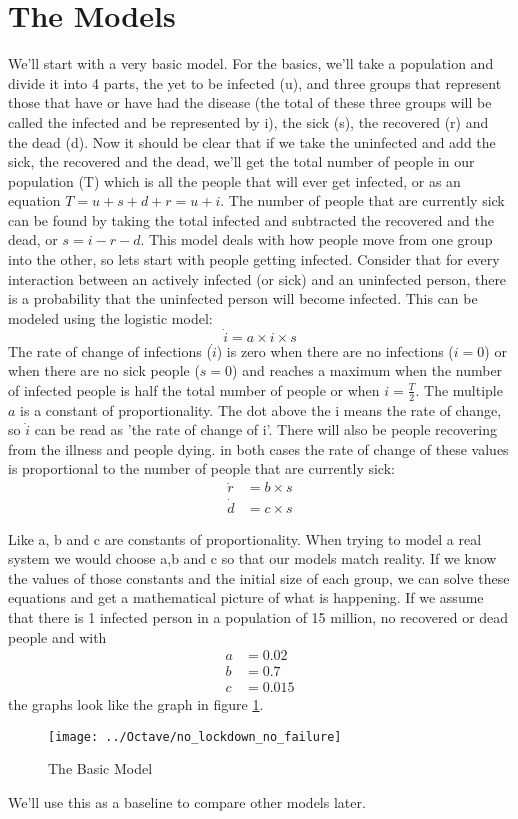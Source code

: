 \section{The Models}

We'll start with a very basic model. For the basics, we'll take a population and divide it into 4 parts, the yet to be infected (u), and three groups that represent those that have or have had the disease (the total of these three groups will be called the infected and be represented by i), the sick (s), the recovered (r) and the dead (d). Now it should be clear that if we take the uninfected and add the sick, the recovered and the dead, we'll get the total number of people in our population (T) which is all the people that will ever get infected, or as an equation \(T=u+s+d+r=u+i\). The number of people that are currently sick can be found by taking the total infected and subtracted the recovered and the dead, or \(s = i-r-d\). This model deals with how people move from one group into the other, so lets start with people getting infected. Consider that for every interaction between an actively infected (or sick) and an uninfected person, there is a probability that the uninfected person will become infected. This can be modeled using the logistic model: 
 \[
\dot{i}=a\times i\times s
\]
The rate of change of infections (\(\dot{i}\)) is zero when there are no infections (\(i=0\)) or when there are no sick people (\(s=0\)) and reaches a maximum when the number of infected people is half the total number of people or when \(i = \frac{T}{2}\). The multiple \(a\) is a constant of proportionality. The dot above the i means the rate of change, so \(\dot{i}\) can be read as 'the rate of change of i'. There will also be people recovering from the illness and people dying. in both cases the rate of change of these values is proportional to the number of people that are currently sick:
\[
\begin{split}
\dot{r} &= b\times s\\
\dot{d} &= c\times s
\end{split}
\]

Like a, b and c are constants of proportionality. When trying to model a real system we would choose a,b and c so that our models match reality. If we know the values of those constants and the initial size of each group, we can solve these equations and get a mathematical picture of what is happening. If we assume that there is 1 infected person in a population of 15 million, no recovered or dead people and with \[
\begin{split}
a &= 0.02\\
b &= 0.7\\
c &= 0.015
\end{split}
\]
the graphs look like the graph in figure \ref{fig:nolockdownnofailure}.
\begin{figure}[H]
	\centering
	\texttt{[image: ../Octave/no\_lockdown\_no\_failure]}
	\caption[The Basic Model]{The Basic Model}
	\label{fig:nolockdownnofailure}
\end{figure}
We'll use this as a baseline to compare other models later.

